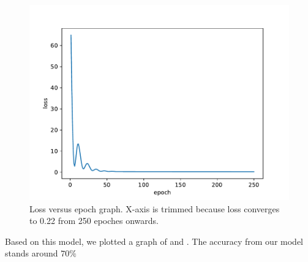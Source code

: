 \documentclass[UTF8]{mcmthesis}
\begin{document}
	\begin{figure}[H]
		\centering
		\includegraphics[width=1.0\linewidth]{figs/fig6.pdf}
		\caption{Loss versus epoch graph. X-axis is trimmed because loss converges to 0.22 from 250 epoches onwards.}
		\label{fig:fig6}
	\end{figure}
	
	
	Based on this model, we plotted a graph of \color{blue}{actual swings} \color{black} and \color{red}{predicted swings} \color{black}. The accuracy from our model stands around $70\%$
	
\end{document}
